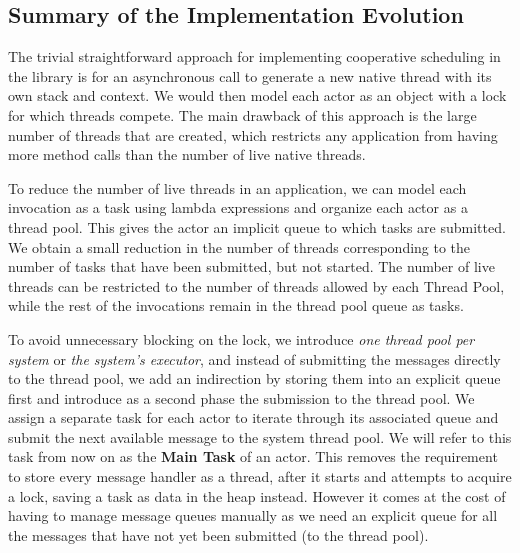 \subsection{Summary of the Implementation Evolution}
\par The trivial straightforward approach for implementing cooperative scheduling in the library is for an asynchronous call to generate a new native thread with its own stack and context. We would then model each actor as an object with a lock for which threads compete. The main drawback of this approach is the large number of threads that are created, which restricts any application from having more method calls than the number of live native threads. 
\par To reduce the number of live threads in an application, we can model each invocation as a task using lambda expressions and organize each actor as a thread pool. This gives the actor an implicit queue to which tasks are submitted. We obtain a small reduction in the number of threads corresponding to the number of tasks that have been submitted, but not started. The number of live threads can be restricted to the number of threads allowed by each Thread Pool, while the rest of the invocations remain in the thread pool queue as tasks.
\par To avoid unnecessary blocking on the lock, we introduce \textit{one thread pool per system} or \textit{the system's executor}, and instead of submitting the messages directly to the thread pool, we add an indirection by storing them into an explicit queue first and introduce as a second phase the submission to the thread pool. We assign a separate task for each actor to iterate through its associated queue and submit the next available message to the system thread pool. We will refer to this task from now on as the \textbf{Main Task} of an actor. This removes the requirement to store every message handler as a thread, after it starts and attempts to acquire a lock, saving a task as data in the heap instead.  However it comes at the cost of having to manage message queues manually as we need an explicit queue for all the messages that have not yet been submitted (to the thread pool). 



